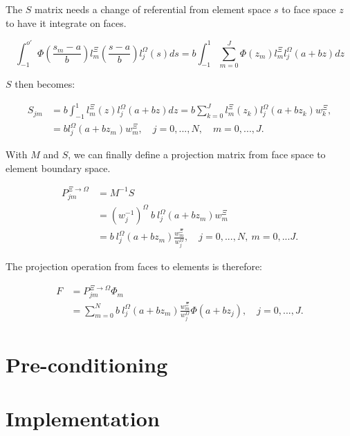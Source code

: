 The $S$ matrix needs a change of referential from element space $s$ to face space $z$ to have it
integrate on faces.

\begin{equation}
	\int_{-1}^{o'} \Phi(\frac{s_m -a}{b})l_m^\Xi(\frac{s -a}{b}) l_j^\Omega(s)ds
	= b\int_{-1}^{1}\sum_{m = 0}^{J} \Phi(z_m)l_m^{\Xi}l_j^{\Omega}(a + bz)dz
\end{equation}

$S$ then becomes: 

\begin{equation}
	\begin{aligned}
		S_{jm} &=  b\int_{-1}^{1}l_m^{\Xi}(z)l_j^{\Omega}(a + bz)dz
		= b\sum_{k = 0}^{J}l_m^{\Xi}(z_k)l_j^{\Omega}(a +b z_k)w_k^{\Xi}, \\
		&= b l_j^{\Omega}(a + bz_m)w_m^{\Xi}, \quad j = 0, ..., N, \quad m = 0, ..., J.
	\end{aligned}
\end{equation}

With $M$ and $S$, we can finally define a projection matrix from face space to element boundary space.

\begin{equation}
	\begin{aligned}
		P^{\Xi \rightarrow \Omega}_{jm} &= M^{-1}S \\
		&= (w_j^{-1})^{\Omega } \: b \: l_j^{\Omega }(a + bz_m)w_m^{\Xi}\\
		&= b \: l_j^{\Omega}(a + bz_m)\frac{w_m^{\Xi}}{w_j^{\Omega}}, \quad j = 0, ..., N, \: m = 0, ... J. 
	\end{aligned}
\end{equation} 

The projection operation from faces to elements is therefore:

\begin{align} \label{projection_face_to_element}
	F &= P^{\Xi \rightarrow \Omega}_{jm} \Phi_m  \\
	&= \sum_{m = 0}^{N} b \: l_j^{\Omega}(a + bz_m)\frac{w_m^{\Xi}}{w_j^{\Omega}} \Phi (a + b z_j), \quad j = 0, ..., J.
\end{align}

\section{Pre-conditioning} \label{section:adaptive_mesh_refinement:pre_conditioning}

\section{Implementation} \label{section:adaptive_mesh_refinement:implementation}

